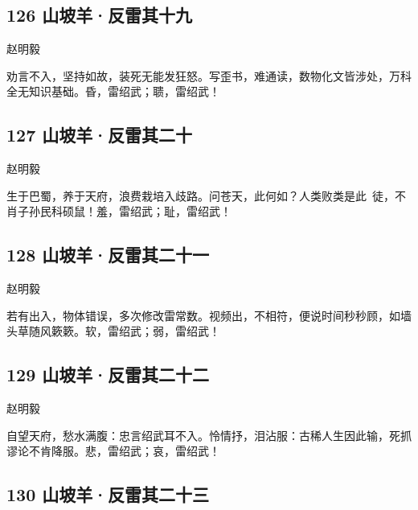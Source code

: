\hypertarget{ux5c71ux5761ux7f8aux53cdux96f7ux5176ux5341ux4e5d}{%
\subsection{126
山坡羊·反雷其十九}\label{ux5c71ux5761ux7f8aux53cdux96f7ux5176ux5341ux4e5d}}

{赵明毅}

劝言不入，坚持如故，装死无能发狂怒。写歪书，难通读，数物化文皆涉处，万科全无知识基础。昏，雷绍武；聩，雷绍武！

\hypertarget{ux5c71ux5761ux7f8aux53cdux96f7ux5176ux4e8cux5341}{%
\subsection{127
山坡羊·反雷其二十}\label{ux5c71ux5761ux7f8aux53cdux96f7ux5176ux4e8cux5341}}

{赵明毅}

生于巴蜀，养于天府，浪费栽培入歧路。问苍天，此何如？人类败类是此~徒，不肖子孙民科硕鼠！羞，雷绍武；耻，雷绍武！
~\\

\hypertarget{ux5c71ux5761ux7f8aux53cdux96f7ux5176ux4e8cux5341ux4e00}{%
\subsection{128
山坡羊·反雷其二十一}\label{ux5c71ux5761ux7f8aux53cdux96f7ux5176ux4e8cux5341ux4e00}}

{赵明毅}

若有出入，物体错误，多次修改雷常数。视频出，不相符，便说时间秒秒顾，如墙头草随风簌簌。软，雷绍武；弱，雷绍武！
~\\

\hypertarget{ux5c71ux5761ux7f8aux53cdux96f7ux5176ux4e8cux5341ux4e8c}{%
\subsection{129
山坡羊·反雷其二十二}\label{ux5c71ux5761ux7f8aux53cdux96f7ux5176ux4e8cux5341ux4e8c}}

{赵明毅}

自望天府，愁水满腹：忠言绍武耳不入。怜情抒，泪沾服：古稀人生因此输，死抓谬论不肯降服。悲，雷绍武；哀，雷绍武！

\hypertarget{ux5c71ux5761ux7f8aux53cdux96f7ux5176ux4e8cux5341ux4e09}{%
\subsection{130
山坡羊·反雷其二十三}\label{ux5c71ux5761ux7f8aux53cdux96f7ux5176ux4e8cux5341ux4e09}}

